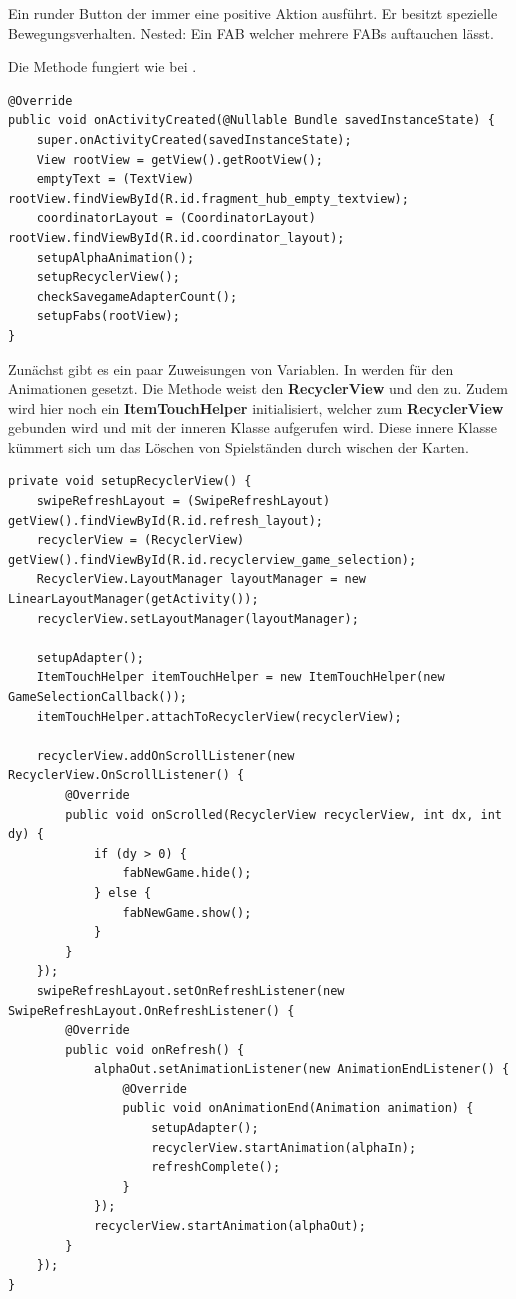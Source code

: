 \begin{infobox}[frametitle=FloatingActionButton]
Ein runder Button der immer eine positive Aktion ausführt. Er
besitzt spezielle Bewegungsverhalten. Nested: Ein FAB welcher mehrere FABs
auftauchen lässt.
\end{infobox}

Die Methode  fungiert wie bei .

\begin{lstlisting}[caption={Spielehub onActivityCreated() Methode},captionpos=b]
@Override
public void onActivityCreated(@Nullable Bundle savedInstanceState) {
	super.onActivityCreated(savedInstanceState);
	View rootView = getView().getRootView();
	emptyText = (TextView) rootView.findViewById(R.id.fragment_hub_empty_textview);
	coordinatorLayout = (CoordinatorLayout) rootView.findViewById(R.id.coordinator_layout);
	setupAlphaAnimation();
	setupRecyclerView();
	checkSavegameAdapterCount();
	setupFabs(rootView);
}
\end{lstlisting}

Zunächst gibt es ein paar Zuweisungen von Variablen. In
 werden für den  Animationen
gesetzt. Die Methode  weist den \textbf{RecyclerView}
und den  zu. Zudem wird hier noch ein
\textbf{ItemTouchHelper} initialisiert, welcher zum \textbf{RecyclerView}
gebunden wird und mit der inneren Klasse  aufgerufen
wird. Diese innere Klasse kümmert sich um das Löschen von Spielständen durch
wischen der Karten.

\begin{lstlisting}[caption={Spielehub setupRecyclerView() Methode},captionpos=b]
private void setupRecyclerView() {
	swipeRefreshLayout = (SwipeRefreshLayout) getView().findViewById(R.id.refresh_layout);
	recyclerView = (RecyclerView) getView().findViewById(R.id.recyclerview_game_selection);
	RecyclerView.LayoutManager layoutManager = new LinearLayoutManager(getActivity());
	recyclerView.setLayoutManager(layoutManager);

	setupAdapter();
	ItemTouchHelper itemTouchHelper = new ItemTouchHelper(new GameSelectionCallback());
	itemTouchHelper.attachToRecyclerView(recyclerView);

	recyclerView.addOnScrollListener(new RecyclerView.OnScrollListener() {
		@Override
		public void onScrolled(RecyclerView recyclerView, int dx, int dy) {
			if (dy > 0) {
				fabNewGame.hide();
			} else {
				fabNewGame.show();
			}
		}
	});
	swipeRefreshLayout.setOnRefreshListener(new SwipeRefreshLayout.OnRefreshListener() {
		@Override
		public void onRefresh() {
			alphaOut.setAnimationListener(new AnimationEndListener() {
				@Override
				public void onAnimationEnd(Animation animation) {
					setupAdapter();
					recyclerView.startAnimation(alphaIn);
					refreshComplete();
				}
			});
			recyclerView.startAnimation(alphaOut);
		}
	});
}
\end{lstlisting}

